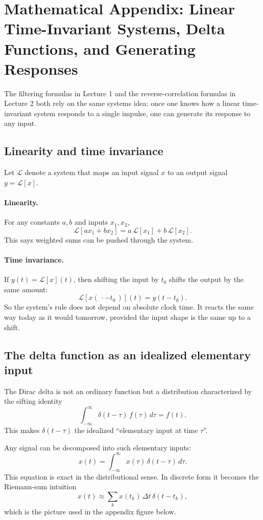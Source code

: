 \documentclass[11pt]{article}
\begin{document}
\section{Mathematical Appendix: Linear Time-Invariant Systems, Delta Functions, and Generating Responses}

The filtering formulas in Lecture 1 and the reverse-correlation formulas in Lecture 2 both rely on the same systems idea: once one knows how a linear time-invariant system responds to a single impulse, one can generate its response to any input.

\subsection{Linearity and time invariance}

Let $\mathcal{L}$ denote a system that maps an input signal $x$ to an output signal $y=\mathcal{L}[x]$.

\paragraph{Linearity.}
For any constants $a,b$ and inputs $x_1,x_2$,
\[
\mathcal{L}[a x_1 + b x_2] = a\,\mathcal{L}[x_1] + b\,\mathcal{L}[x_2].
\]
This says weighted sums can be pushed through the system.

\paragraph{Time invariance.}
If $y(t)=\mathcal{L}[x](t)$, then shifting the input by $t_0$ shifts the output by the same amount:
\[
\mathcal{L}[x(\,\cdot - t_0\,)](t)=y(t-t_0).
\]
So the system's rule does not depend on absolute clock time. It reacts the same way today as it would tomorrow, provided the input shape is the same up to a shift.

\subsection{The delta function as an idealized elementary input}

The Dirac delta is not an ordinary function but a distribution characterized by the sifting identity
\[
\int_{-\infty}^{\infty} \delta(t-\tau)\,f(\tau)\,d\tau = f(t).
\]
This makes $\delta(t-\tau)$ the idealized ``elementary input at time $\tau$''.

Any signal can be decomposed into such elementary inputs:
\[
x(t)=\int_{-\infty}^{\infty} x(\tau)\,\delta(t-\tau)\,d\tau.
\]
This equation is exact in the distributional sense. In discrete form it becomes the Riemann-sum intuition
\[
x(t)\approx \sum_k x(t_k)\,\Delta t\,\delta(t-t_k),
\]
which is the picture used in the appendix figure below.
\end{document}
